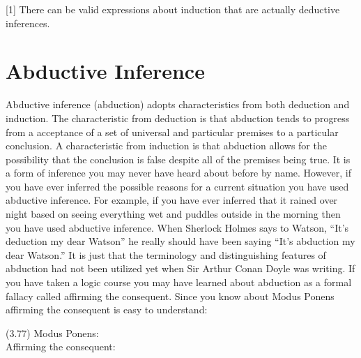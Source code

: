\documentclass[
]{book}
\begin{document}
{[}1{]} There can be valid expressions about induction that are actually deductive inferences.

\hypertarget{abductive-inference}{%
\section{Abductive Inference}\label{abductive-inference}}

Abductive inference (abduction) adopts characteristics from both deduction and induction. The characteristic from deduction is that abduction tends to progress from a acceptance of a set of universal and particular premises to a particular conclusion. A characteristic from induction is that abduction allows for the possibility that the conclusion is false despite all of the premises being true. It is a form of inference you may never have heard about before by name. However, if you have ever inferred the possible reasons for a current situation you have used abductive inference. For example, if you have ever inferred that it rained over night based on seeing everything wet and puddles outside in the morning then you have used abductive inference. When Sherlock Holmes says to Watson, ``It's deduction my dear Watson'' he really should have been saying ``It's abduction my dear Watson.'' It is just that the terminology and distinguishing features of abduction had not been utilized yet when Sir Arthur Conan Doyle was writing.
If you have taken a logic course you may have learned about abduction as a formal fallacy called affirming the consequent. Since you know about Modus Ponens affirming the consequent is easy to understand:

(3.77) Modus Ponens:\\
Affirming the consequent:
\end{document}
